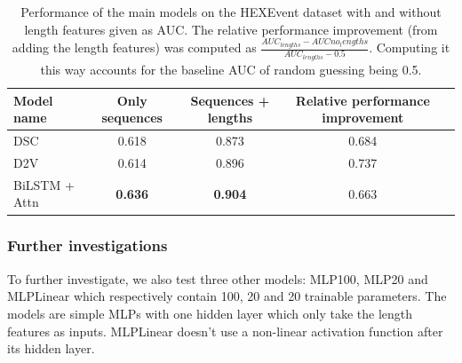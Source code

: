 \begin{table}[h!]
	\centering
	\begin{tabular}{| l | c | c | c| c} 
		\hline
		Model name & Only sequences & Sequences + lengths & Relative performance improvement\\
		\hline
		DSC & 0.618 & 0.873 & 0.684\\
		D2V & 0.614 & 0.896 & 0.737\\
		BiLSTM + Attn & \textbf{0.636} & \textbf{0.904} & 0.663\\
		\hline
	\end{tabular}
	\caption{Performance of the main models on the HEXEvent dataset with and without length features given as AUC. The relative performance improvement (from adding the length features) was computed as $\frac{AUC_{lengths} - AUC{no_lengths}}{AUC_{lengths} - 0.5}$. Computing it this way accounts for the baseline AUC of random guessing being 0.5.
	}
	\label{table:results_hexevent}
\end{table}

\subsubsection{Further investigations}
To further investigate, we also test three other models: MLP100, MLP20 and MLPLinear which respectively contain 100, 20 and 20 trainable parameters. The models are simple MLPs with one hidden layer which only take the length features as inputs. MLPLinear doesn't use a non-linear activation function after its hidden layer.

